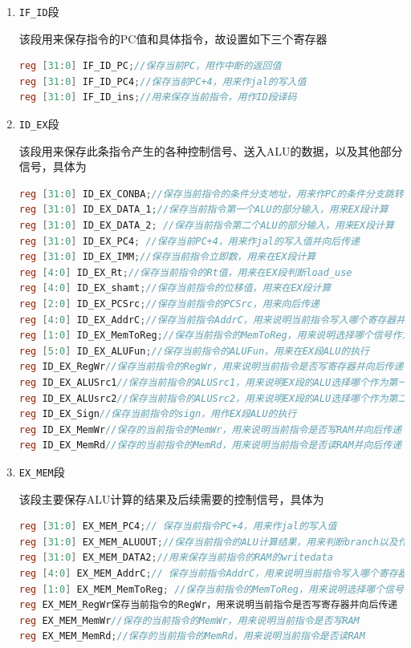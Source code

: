 \documentclass{ctexart}
\begin{document}
		\begin{enumerate}
			\item \verb"IF_ID"段

			该段用来保存指令的PC值和具体指令，故设置如下三个寄存器

\begin{lstlisting}[language = verilog]
reg [31:0] IF_ID_PC;//保存当前PC，用作中断的返回值
reg [31:0] IF_ID_PC4;//保存当前PC+4，用来作jal的写入值
reg [31:0] IF_ID_ins;//用来保存当前指令，用作ID段译码
\end{lstlisting}

			\item \verb"ID_EX"段
			
			该段用来保存此条指令产生的各种控制信号、送入ALU的数据，以及其他部分信号，具体为

\begin{lstlisting}[language = verilog]
reg [31:0] ID_EX_CONBA;//保存当前指令的条件分支地址，用来作PC的条件分支跳转值
reg [31:0] ID_EX_DATA_1;//保存当前指令第一个ALU的部分输入，用来EX段计算
reg [31:0] ID_EX_DATA_2; //保存当前指令第二个ALU的部分输入，用来EX段计算
reg [31:0] ID_EX_PC4; //保存当前PC+4，用来作jal的写入值并向后传递
reg [31:0] ID_EX_IMM;//保存当前指令立即数，用来在EX段计算
reg [4:0] ID_EX_Rt;//保存当前指令的Rt值，用来在EX段判断load_use
reg [4:0] ID_EX_shamt;//保存当前指令的位移值，用来在EX段计算
reg [2:0] ID_EX_PCSrc;//保存当前指令的PCSrc，用来向后传递
reg [4:0] ID_EX_AddrC;//保存当前指令AddrC，用来说明当前指令写入哪个寄存器并向后传递
reg [1:0] ID_EX_MemToReg;//保存当前指令的MemToReg，用来说明选择哪个信号作为寄存器的写入并向后传递
reg [5:0] ID_EX_ALUFun;//保存当前指令的ALUFun，用来在EX段ALU的执行
reg ID_EX_RegWr//保存当前指令的RegWr，用来说明当前指令是否写寄存器并向后传递
reg ID_EX_ALUSrc1//保存当前指令的ALUSrc1，用来说明EX段的ALU选择哪个作为第一个输入
reg ID_EX_ALUsrc2//保存当前指令的ALUSrc2，用来说明EX段的ALU选择哪个作为第二个输入
reg ID_EX_Sign//保存当前指令的sign，用作EX段ALU的执行
reg ID_EX_MemWr//保存的当前指令的MemWr，用来说明当前指令是否写RAM并向后传递
reg ID_EX_MemRd//保存的当前指令的MemRd，用来说明当前指令是否读RAM并向后传递
\end{lstlisting}

			\item \verb"EX_MEM"段

			该段主要保存ALU计算的结果及后续需要的控制信号，具体为			

\begin{lstlisting}[language = verilog]
reg [31:0] EX_MEM_PC4;// 保存当前指令PC+4，用来作jal的写入值
reg [31:0] EX_MEM_ALUOUT;//保存当前指令的ALU计算结果，用来判断branch以及作为当前指令的寄存器写入值
reg [31:0] EX_MEM_DATA2;//用来保存当前指令的RAM的writedata
reg [4:0] EX_MEM_AddrC;// 保存当前指令AddrC，用来说明当前指令写入哪个寄存器并向后传递
reg [1:0] EX_MEM_MemToReg; //保存当前指令的MemToReg，用来说明选择哪个信号作为寄存器的写入并向后传递
reg EX_MEM_RegWr保存当前指令的RegWr，用来说明当前指令是否写寄存器并向后传递
reg EX_MEM_MemWr//保存的当前指令的MemWr，用来说明当前指令是否写RAM
reg EX_MEM_MemRd;//保存的当前指令的MemRd，用来说明当前指令是否读RAM
\end{lstlisting}


\end{enumerate}
\end{document}
